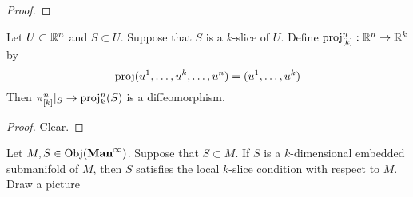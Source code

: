 \documentclass{book}
\begin{document}
	\begin{proof}
	\end{proof}

	\begin{ex} 
		Let $U \subset \mathbb{R}^n$ and $S \subset U$. Suppose that $S$ is a $k$-slice of $U$. Define $\operatorname{\text{proj}}^n_{[k]}: \mathbb{R}^n \rightarrow \mathbb{R}^k$ by $$\operatorname{\text{proj}}(u^1, \dots, u^k, \dots, u^n) = (u^1, \dots, u^k)$$ Then $\pi^n_{[k]}|_{S} \rightarrow \operatorname{\text{proj}}^n_{k}(S)$ is a diffeomorphism.
	\end{ex}	
	
	\begin{proof}
		Clear. 
	\end{proof}

	\begin{ex} 
		Let $M,S \in \operatorname{Obj}(\operatorname*{\text{\textbf{Man}}^{\infty}})$. Suppose that $S \subset M$. If $S$ is a $k$-dimensional embedded submanifold of $M$, then $S$ satisfies the local $k$-slice condition with respect to $M$. \\
		 Draw a picture
	\end{ex}
\end{document}
